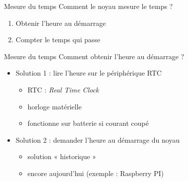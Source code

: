\def\inc{inc1-5-time}




\begin {frame} {Mesure du temps}
    Comment le noyau mesure le temps ?

    \begin {enumerate}
	\item Obtenir l'heure au démarrage
	\item Compter le temps qui passe
    \end {enumerate}
\end {frame}

\begin {frame} {Mesure du temps}
    Comment obtenir l'heure au démarrage ?
    \begin {itemize}
	\item Solution 1 : lire l'heure sur le périphérique RTC

	    \begin {itemize}
		\item RTC : \textit {Real Time Clock}
		\item horloge matérielle
		\item fonctionne sur batterie si courant coupé
	    \end {itemize}

	\item Solution 2 : demander l'heure au démarrage du noyau

	    \begin {itemize}
		\item solution « historique »
		\item encore aujourd'hui (exemple : Raspberry PI)
	    \end {itemize}

    \end {itemize}
\end {frame}

